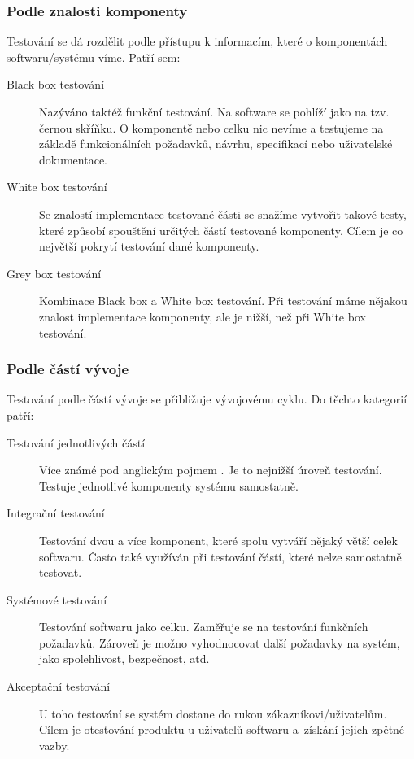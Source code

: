 \subsubsection{Podle znalosti komponenty}

Testování se dá rozdělit podle přístupu k informacím, které o komponentách softwaru/systému víme. Patří sem:

\begin{description}
    \item[Black box testování] Nazýváno taktéž funkční testování. Na software se pohlíží jako na tzv. černou skříňku. O komponentě nebo celku nic nevíme a testujeme na základě funkcionálních požadavků, návrhu, specifikací nebo uživatelské dokumentace. 
    \item[White box testování] Se znalostí implementace testované části se snažíme vytvořit takové testy, které způsobí spouštění určitých částí testované komponenty. Cílem je co největší pokrytí testování dané komponenty.
    \item[Grey box testování] Kombinace Black box a White box testování. Při testování máme nějakou znalost implementace komponenty, ale je nižší, než při White box testování. \cite{khan2010different}
\end{description}

\subsubsection{Podle částí vývoje}

Testování podle částí vývoje se přibližuje vývojovému cyklu. Do těchto kategorií patří:  

\begin{description}
    \item[Testování jednotlivých částí] Více známé pod anglickým pojmem . Je to nejnižší úroveň testování. Testuje jednotlivé komponenty systému samostatně.
    \item[Integrační testování] Testování dvou a více komponent, které spolu vytváří nějaký větší celek softwaru. Často také využíván při testování částí, které nelze samostatně testovat.
    \item[Systémové testování] Testování softwaru jako celku. Zaměřuje se na testování funkčních požadavků. Zároveň je možno vyhodnocovat další požadavky na systém, jako spolehlivost, bezpečnost, atd.
    \item[Akceptační testování] U toho testování se systém dostane do rukou zákazníkovi/uživatelům. Cílem je otestování produktu u uživatelů softwaru a~získání jejich zpětné vazby. 
\end{description}


